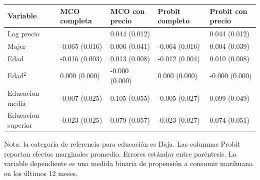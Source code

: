 \begin{tabular}{lllll}
\toprule
Variable & MCO completa & MCO con precio & Probit completo & Probit con precio \\
\midrule
Log precio &  & 0.044 (0.012) &  & 0.044 (0.012) \\
Mujer & -0.065 (0.016) & 0.006 (0.041) & -0.064 (0.016) & 0.004 (0.039) \\
Edad & -0.016 (0.003) & 0.013 (0.008) & -0.012 (0.004) & 0.010 (0.008) \\
Edad$^2$ & 0.000 (0.000) & -0.000 (0.000) & 0.000 (0.000) & -0.000 (0.000) \\
Educacion media & -0.007 (0.025) & 0.105 (0.055) & -0.005 (0.027) & 0.099 (0.049) \\
Educacion superior & -0.023 (0.025) & 0.079 (0.057) & -0.023 (0.027) & 0.074 (0.051) \\
\bottomrule
\end{tabular}

\begin{flushleft}\footnotesize Nota: la categoría de referencia para educación es Baja. Las columnas Probit reportan efectos marginales promedio. Errores estándar entre paréntesis. La variable dependiente es una medida binaria de propensión a consumir marihuana en los últimos 12 meses.\end{flushleft}
